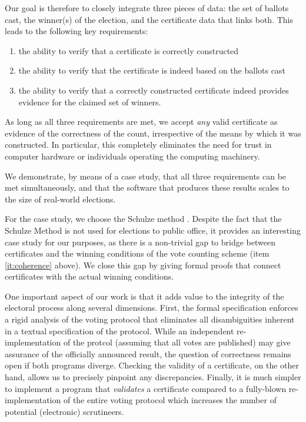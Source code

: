 \documentclass{llncs}
\begin{document}
Our goal is therefore to closely integrate three pieces of data: the
set of ballots cast, the winner(s) of the election, and the
certificate data that links both. This leads to the following key
requirements:
\begin{enumerate}
\item the ability to verify that a certificate is correctly
constructed
\item the ability to verify that the certificate is indeed based on
the ballots cast
\item \label{it:coherence} the ability to verify that a correctly constructed certificate
indeed provides evidence for the claimed set of winners.
\end{enumerate}

\noindent
As long as all three requirements are met, we accept \emph{any}
valid certificate as evidence of the correctness of the count,
irrespective of the means by which it was constructed. In
particular, this completely eliminates the need for trust in
computer hardware or individuals operating the computing machinery.

We demonstrate, by means of a case study, that all three
requirements can be met simultaneously, and that the software that
produces these results scales to the size of real-world elections.

For the case study, we choose the Schulze method
\cite{Schulze:2011:NMC}.
Despite the fact that the Schulze Method is not used for elections
to public office, it provides an interesting case study for our
purposes, as there is a non-trivial gap to bridge between
certificates and the winning conditions of the vote counting scheme
(item \ref{it:coherence} above).
We close this gap by giving formal proofs that connect certificates
with the actual winning conditions.

One important aspect of our work is that it adds value to the
integrity of the electoral process along several dimensions. First,
the formal specification enforces a rigid analysis of the voting
protocol that eliminates all disambiguities inherent in a textual
specification of the protocol.  While an independent 
re-implementation of the protcol (assuming that all votes are
published) may give assurance of the officially announced result,
the question of correctness remains open if both programs diverge.
Checking the validity of a certificate, on the other hand, allows us
to precisely pinpoint any discrepancies. Finally, it is much simpler
to implement a program that \emph{validates} a certificate compared
to a fully-blown re-implementation of the entire voting protocol
which increases the number of potential (electronic) scrutineers. 
\end{document}
